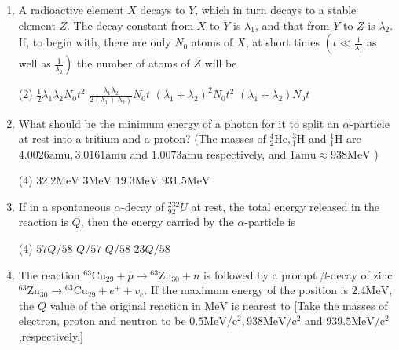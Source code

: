 \begin{enumerate}
	\item  A radioactive element $X$ decays to $Y$, which in turn decays to a stable element $Z$. The decay constant from $X$ to $Y$ is $\lambda_1$, and that from $Y$ to $Z$ is $\lambda_2$. If, to begin with, there are only $N_0$ atoms of $X$, at short times $\left(t \ll \frac{1}{\lambda_1}\right.$ as well as $\left.\frac{1}{\lambda_2}\right)$ the number of atoms of $Z$ will be
	{}
	 \begin{tasks}(2)
		\task[\textbf{a.}]$\frac{1}{2} \lambda_1 \lambda_2 N_0 t^2$
		\task[\textbf{b.}]$\frac{\lambda_1 \lambda_2}{2\left(\lambda_1+\lambda_2\right)} N_0 t$
		\task[\textbf{c.}]$\left(\lambda_1+\lambda_2\right)^2 N_0 t^2$
		\task[\textbf{d.}]$\left(\lambda_1+\lambda_2\right) N_0 t$
	\end{tasks}
	\item What should be the minimum energy of a photon for it to split an $\alpha$-particle at rest into a tritium and a proton?
	(The masses of ${ }_2^4 \mathrm{He},{ }_1^3 \mathrm{H}$ and ${ }_1^1 \mathrm{H}$ are $4.0026 \mathrm{amu}, 3.0161 \mathrm{amu}$ and $1.0073 \mathrm{amu}$ respectively, and $1 \mathrm{amu} \approx 938 \mathrm{MeV}$ )
	{}
	 \begin{tasks}(4)
		\task[\textbf{a.}]$32.2 \mathrm{MeV}$
		\task[\textbf{b.}]$3 \mathrm{MeV}$
		\task[\textbf{c.}]$19.3 \mathrm{MeV}$
		\task[\textbf{d.}] $931.5 \mathrm{MeV}$
	\end{tasks}
	\item If in a spontaneous $\alpha$-decay of ${ }_{92}^{232} U$ at rest, the total energy released in the reaction is $Q$, then the energy carried by the $\alpha$-particle is
	{}
	 \begin{tasks}(4)
		\task[\textbf{a.}]$57 Q / 58$
		\task[\textbf{b.}]$Q / 57$
		\task[\textbf{c.}]$Q / 58$
		\task[\textbf{d.}] $23 Q / 58$
	\end{tasks}
	\item The reaction ${ }^{63} \mathrm{Cu}_{29}+p \rightarrow{ }^{63} \mathrm{Zn}_{30}+n$ is followed by a prompt $\beta$-decay of zinc ${ }^{63} \mathrm{Zn}_{30} \rightarrow{ }^{63} \mathrm{Cu}_{29}+e^{+}+v_e$. If the maximum energy of the position is $2.4 \mathrm{MeV}$, the $Q$ value of the original reaction in $\mathrm{MeV}$ is nearest to
	[Take the masses of electron, proton and neutron to be $0.5 \mathrm{MeV} / \mathrm{c}^2, 938 \mathrm{MeV} / \mathrm{c}^2$ and $939.5 \mathrm{MeV} / \mathrm{c}^2$,respectively.]

\end{enumerate}
